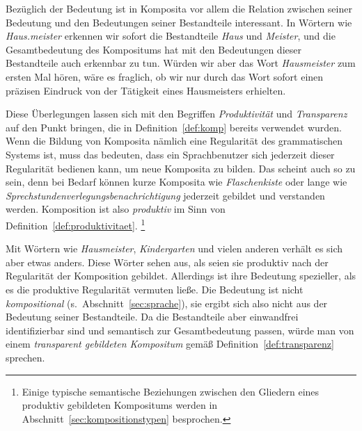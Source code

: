 Bezüglich der Bedeutung ist in Komposita vor allem die Relation zwischen seiner Bedeutung und den Bedeutungen seiner Bestandteile interessant.
In Wörtern wie \textit{Haus.mei\-ster} erkennen wir sofort die Bestandteile \textit{Haus} und \textit{Meister}, und die Gesamtbedeutung des Kompositums hat mit den Bedeutungen dieser Bestandteile auch erkennbar zu tun.
Würden wir aber das Wort \textit{Hausmeister} zum ersten Mal hören, wäre es fraglich, ob wir nur durch das Wort sofort einen präzisen Eindruck von der Tätigkeit eines Hausmeisters erhielten.

Diese Überlegungen lassen sich mit den Begriffen \textit{Produktivität} und \textit{Transparenz} auf den Punkt bringen, die in Definition~\ref{def:komp} bereits verwendet wurden.
Wenn die Bildung von Komposita nämlich eine Regularität des grammatischen Systems ist, muss das bedeuten, dass ein Sprachbenutzer sich jederzeit dieser Regularität bedienen kann, um neue Komposita zu bilden.
Das scheint auch so zu sein, denn bei Bedarf können kurze Komposita wie \textit{Flaschenkiste} oder lange wie \textit{Sprechstundenverlegungsbenachrichtigung} jederzeit gebildet und verstanden werden.
Komposition ist also \textit{produktiv} im Sinn von Definition~\ref{def:produktivitaet}.%
\footnote{Einige typische semantische Beziehungen zwischen den Gliedern eines produktiv gebildeten Kompositums werden in Abschnitt~\ref{sec:kompositionstypen} besprochen.}


Mit Wörtern wie \textit{Hausmeister}, \textit{Kindergarten} und vielen anderen verhält es sich aber etwas anders.
Diese Wörter sehen aus, als seien sie produktiv nach der Regularität der Komposition gebildet.
Allerdings ist ihre Bedeutung spezieller, als es die produktive Regularität vermuten ließe.
Die Bedeutung ist nicht \textit{kompositional} (s.\ Abschnitt~\ref{sec:sprache}), sie ergibt sich also nicht aus der Bedeutung seiner Bestandteile.
Da die Bestandteile aber einwandfrei identifizierbar sind und semantisch zur Gesamtbedeutung passen, würde man von einem \textit{transparent gebildeten Kompositum} gemäß Definition~\ref{def:transparenz} sprechen.


